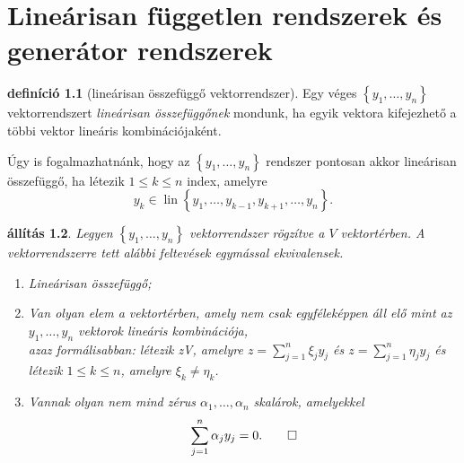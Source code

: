 \documentclass[9pt, showtrims]{memoir}
\theoremstyle{plain}
\newtheorem{proposition}{állítás}[section]
\theoremstyle{remark}
\theoremstyle{definition}
\newtheorem{definition}[proposition]{definíció}
\DeclareMathOperator{\lin}{lin}
\begin{document}
\chapter{Lineárisan független rendszerek és generátor rendszerek}
\begin{definition}[lineárisan összefüggő vektorrendszer]
    Egy véges $\left\{ y_1,\dots,y_n \right\}$ vektorrendszert \emph{lineárisan összefüggőnek}
    mondunk, ha egyik vektora kifejezhető a többi vektor lineáris kombinációjaként.
\end{definition}
Úgy is fogalmazhatnánk, hogy az $\left\{ y_1,\dots,y_n \right\}$ rendszer pontosan akkor
lineárisan összefüggő, ha létezik $1\leq k\leq n$ index, amelyre
\[
    y_k\in\lin\left\{ y_1,\dots,y_{k-1},y_{k+1},\dots,y_n \right\}.
\]
\begin{proposition}
    Legyen $\left\{ y_1,\dots,y_n \right\}$ vektorrendszer rögzítve a $V$ vektortérben.
    A vektorrendszerre tett alábbi feltevések egymással ekvivalensek.
    \begin{enumerate}
        \item Lineárisan összefüggő;
        \item Van olyan elem a vektortérben, amely nem csak egyféleképpen áll elő mint az $y_1,\dots,y_n$
            vektorok lineáris kombinációja,\\
            azaz formálisabban:
            létezik z\in V, amelyre $z=\sum_{j=1}^n\xi_jy_j$ és $z=\sum_{j=1}^n\eta_jy_j$
            és létezik $1\leq k\leq n$, amelyre $\xi_k\neq\eta_k$.
        \item Vannak olyan nem mind zérus $\alpha_1,\dots,\alpha_n$ skalárok, amelyekkel
            \[
                \sum_{j=1}^n\alpha_jy_j=0.\qedhere
            \]
    \end{enumerate}
\end{proposition}
\end{document}
